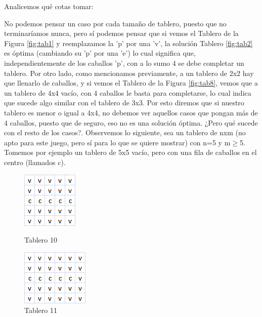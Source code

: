 Analicemos qué cotas tomar:

No podemos pensar un caso por cada tamaño de tablero, puesto que no terminaríamos nunca, pero sí podemos pensar que si vemos el Tablero de la Figura \ref{fig:tab1} y reemplazamos la 'p' por una 'v', la solución Tablero \ref{fig:tab2} es óptima (cambiando su 'p' por una 'e') lo cual significa que, independientemente de los caballos 'p', con a lo sumo 4 se debe completar un tablero. Por otro lado, como mencionamos previamente, a un tablero de 2x2 hay que llenarlo de caballos, y si vemos el Tablero de la Figura \ref{fig:tab8}, vemos que a un tablero de 4x4 vacío, con 4 caballos le basta para completarse, lo cual indica que sucede algo similar con el tablero de 3x3. Por esto diremos que si nuestro tablero es menor o igual a 4x4, no debemos ver aquellos casos que pongan más de 4 caballos, puesto que de seguro, eso no es una solución óptima. ¿Pero qué sucede con el resto de los casos?. Observemos lo siguiente, sea un tablero de nxm (no apto para este juego, pero sí para lo que se quiere mostrar) con n=5 y m$\geq$5. Tomemos por ejemplo un tablero de 5x5 vacío, pero con una fila de caballos en el centro (llamados c).


\begin{figure}[!htb]
  \includegraphics[scale=1]{imagenes/tab10.png}
  \caption{Tablero 10}\label{fig:tab10}
\endminipage
{}
  \includegraphics[scale=1]{imagenes/tab11.png}
  \caption{Tablero 11}\label{fig:tab11}
\endminipage
\end{figure}


